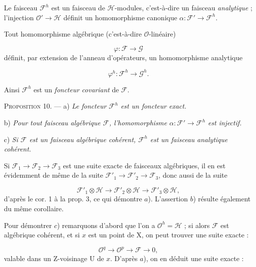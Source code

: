 Le faisceau $\mathcal{F}^h$ est un faisceau de $\mathcal{H}$-modules, c'est-à-dire un faisceau \emph{analytique} ; l'injection $\mathcal{O}' \to \mathcal{H}$ définit un homomorphisme canonique $\alpha : \mathcal{F}' \to \mathcal{F}^h$.

Tout homomorphisme algébrique (c'est-à-dire $\mathcal{O}$-linéaire)

\begin{equation*}
\varphi : \mathcal{F} \to \mathcal{G}
\end{equation*}
définit, par extension de l'anneau d'opérateurs, un homomorphisme analytique

\begin{equation*}
\varphi^h : \mathcal{F}^h \to \mathcal{G}^h.
\end{equation*}


Ainsi $\mathcal{F}^h$ est un \emph{foncteur covariant} de $\mathcal{F}$.

\textsc{Proposition} 10. --- a) \emph{Le foncteur $\mathcal{F}^h$ est un foncteur exact.}

b) \emph{Pour tout faisceau algébrique $\mathcal{F}$, l'homomorphisme $\alpha : \mathcal{F}' \to \mathcal{F}^h$ est injectif.}

c) \emph{Si $\mathcal{F}$ est un faisceau algébrique cohérent, $\mathcal{F}^h$ est un faisceau analytique cohérent.}

Si $\mathcal{F}_1 \to \mathcal{F}_2 \to \mathcal{F}_3$ est une suite exacte de faisceaux algébriques, il en est évidemment de même de la suite $\mathcal{F}'_1 \to \mathcal{F}'_2 \to \mathcal{F}_3$, donc aussi de la suite

\begin{equation*}
\mathcal{F}'_1 \otimes \mathcal{H} \to \mathcal{F}'_2 \otimes \mathcal{H} \to \mathcal{F}'_3 \otimes \mathcal{H},
\end{equation*}
d'après le cor. 1 à la prop. 3, ce qui démontre $a$). L'assertion $b$) résulte également du même corollaire.

Pour démontrer $c$) remarquons d'abord que l'on a $\mathcal{O}^h = \mathcal{H}$ ; si alors $\mathcal{F}$ est algébrique cohérent, et si $x$ est un point de $\mathrm{X}$, on peut trouver une suite exacte :

\begin{equation*}
\mathcal{O}^q \to \mathcal{O}^p \to \mathcal{F} \to 0,
\end{equation*}
valable dans un Z-voisinage $\mathrm{U}$ de $x$. D'après $a$), on en déduit une suite exacte :

